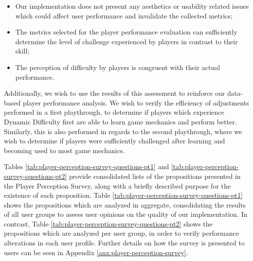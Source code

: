 \begin{itemize}
    \item{Our implementation does not present any aesthetics or usability related issues which could affect user performance and invalidate the collected metrics;}
    \item{The metrics selected for the player performance evaluation can sufficiently determine the level of challenge experienced by players in contrast to their skill;}
    \item{The perception of difficulty by players is congruent with their actual performance.}
\end{itemize}

Additionally, we wish to use the results of this assessment to reinforce our data-based player performance analysis. We wish to verify the efficiency of adjustments performed in a first playthrough, to determine if players which experience Dynamic Difficulty first are able to learn game mechanics and perform better. Similarly, this is also performed in regards to the second playthrough, where we wish to determine if players were sufficiently challenged after learning and becoming used to most game mechanics.

Tables \ref{tab:player-perception-survey-questions-pt1} and \ref{tab:player-perception-survey-questions-pt2} provide consolidated lists of the propositions presented in the Player Perception Survey, along with a briefly described purpose for the existence of each proposition. Table \ref{tab:player-perception-survey-questions-pt1} shows the propositions which are analyzed in aggregate, consolidating the results of all user groups to assess user opinions on the quality of our implementation. In contrast, Table \ref{tab:player-perception-survey-questions-pt2} shows the propositions which are analyzed per user group, in order to verify performance alterations in each user profile. Further details on how the survey is presented to users can be seen in Appendix \ref{anx:player-perception-survey}.

